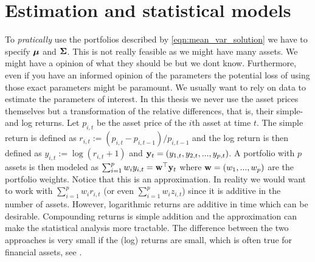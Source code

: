 \documentclass[]{book}\usepackage{knitr}
\begin{document}
\chapter{Estimation and statistical models}\label{ch:estim}


To \textit{pratically} use the portfolios described by \eqref{eqn:mean_var_solution} we have to specify $\mbox{\boldmath$\mu$}$ and $\mathbf{\Sigma}$. 
This is not really feasible as we might have many assets. 
We might have a opinion of what they should be but we dont know. 
Furthermore, even if you have an informed opinion of the parameters the potential loss of using those exact parameters might be paramount. 
We usually want to rely on data to estimate the parameters of interest. 
In this thesis we never use the asset prices themselves but a transformation of the relative differences, that is, their simple- and log returns. 
Let $p_{i,t}$ be the asset price of the $i$th asset at time $t$. 
The simple return is defined as $r_{i,t} := (p_{i,t}-p_{i,t-1})/p_{i,t-1}$ and the log return is then defined as $y_{i,t} := \log(r_{i,t} + 1)$ and $\mathbf{y}_t=(y_{1,t},y_{2,t},..., y_{p,t})$.
A portfolio with $p$ assets is then modeled as $\sum_{i=1}^p w_i y_{i,t} = \mathbf{w}^\top \mathbf{y}_t$ where $\mathbf{w}=(w_1, ..., w_p)$ are the portfolio weights.
Notice that this is an approximation. 
In reality we would want to work with $\sum_{i=1}^p w_i r_{i,t}$ (or even $\sum_{i=1}^p w_i z_{i,t}$) since it is additive in the number of assets. 
However, logarithmic returns are additive in time which can be desirable. 
Compounding returns is simple addition and the approximation can make the statistical analysis more tractable. 
The difference between the two approaches is very small if the (log) returns are small, which is often true for financial assets, see \citet[p. 5]{tsay2005analysis}. 
\end{document}
